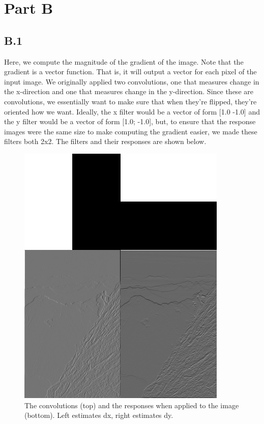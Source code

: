 \documentclass{article}
\begin{document}
\section{Part B}

\subsection{B.1}

Here, we compute the magnitude of the gradient of the image. Note that the 
gradient is a vector function. That is, it will output a vector for each pixel 
of the input image. We originally applied two convolutions, one that measures 
change in the x-direction and one that measures change in the y-direction. Since 
these are convolutions, we essentially want to make sure that when they're flipped, 
they're oriented how we want. Ideally, 
the x filter would be a vector of form [1.0 -1.0] and the y filter would be a vector 
of form [1.0; -1.0], but, to ensure that the response images were the same size to 
make computing the gradient easier, we made these filters both 2x2. The filters 
and their responses are shown below.

\begin{figure}[!ht]
	\centering
	\includegraphics[width=100mm]{figs/dx_dy_filters_no_blur.png}
	\caption{The convolutions (top) and the responses when applied to the image 
        (bottom). Left estimates dx, right estimates dy.}
\end{figure}
\end{document}
